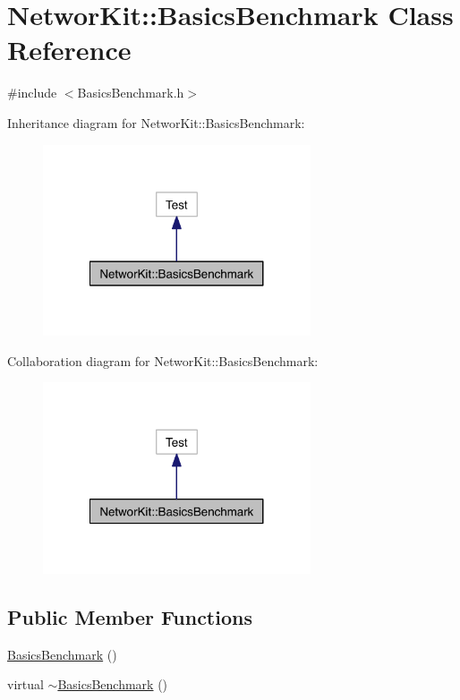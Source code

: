 \hypertarget{class_networ_kit_1_1_basics_benchmark}{\section{Networ\-Kit\-:\-:Basics\-Benchmark Class Reference}
\label{class_networ_kit_1_1_basics_benchmark}
}


{\ttfamily \#include $<$Basics\-Benchmark.\-h$>$}



Inheritance diagram for Networ\-Kit\-:\-:Basics\-Benchmark\-:\nopagebreak
\begin{figure}[H]
\begin{center}
\leavevmode
\includegraphics[width=224pt]{class_networ_kit_1_1_basics_benchmark__inherit__graph}
\end{center}
\end{figure}


Collaboration diagram for Networ\-Kit\-:\-:Basics\-Benchmark\-:\nopagebreak
\begin{figure}[H]
\begin{center}
\leavevmode
\includegraphics[width=224pt]{class_networ_kit_1_1_basics_benchmark__coll__graph}
\end{center}
\end{figure}
\subsection*{Public Member Functions}
\begin{DoxyCompactItemize}
\item 
\hyperlink{class_networ_kit_1_1_basics_benchmark_ad0d3519c5b7e4ca63e4df787ac5626fc}{Basics\-Benchmark} ()
\item 
virtual \hyperlink{class_networ_kit_1_1_basics_benchmark_acaf4cf386d34c49e7c09925c6402dae8}{$\sim$\-Basics\-Benchmark} ()
\end{DoxyCompactItemize}



